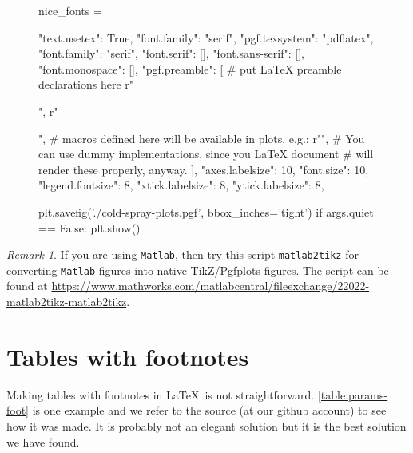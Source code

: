 \documentclass[authoryear,3p,times,preprint,review,fleqn]{elsarticle}
\numberwithin{equation}{section}
\theoremstyle{remark}
\newtheorem{rmk}{Remark}
\begin{document}
\begin{appendices}
\begin{figure}[!h]
  \begin{snippet}[caption={Python script for plotting data.},label={snippet_matplotlib_pgf},framerule=1pt,tabsize=3]   
    nice_fonts = {
            "text.usetex": True,
            "font.family": "serif",
            "pgf.texsystem": "pdflatex",
            "font.family": "serif",
            "font.serif": [],
            "font.sans-serif": [],
            "font.monospace": [],
            "pgf.preamble": [
            # put LaTeX preamble declarations here
            r"\usepackage[utf8x]{inputenc}",
            r"\usepackage[T1]{fontenc}",
            # macros defined here will be available in plots, e.g.:
            r"\newcommand{\vect}[1]{#1}",
            # You can use dummy implementations, since you LaTeX document
            # will render these properly, anyway.
            ],
            "axes.labelsize": 10,
            "font.size": 10,
            "legend.fontsize": 8,
            "xtick.labelsize": 8,
            "ytick.labelsize": 8,
    }
    plt.savefig('./cold-spray-plots.pgf', bbox_inches='tight') 
    if args.quiet == False:
        plt.show()
  \end{snippet}
\end{figure}

\begin{rmk}
If you are using \texttt{Matlab}, then try this script \texttt{matlab2tikz} for converting \texttt{Matlab} figures into native TikZ/Pgfplots figures. The script can be found at
\url{https://www.mathworks.com/matlabcentral/fileexchange/22022-matlab2tikz-matlab2tikz}.
\end{rmk}

\section{Tables with footnotes}\label{sec:tab-foonote}

Making tables with footnotes in \LaTeX\ is not straightforward.  \cref{table:params-foot} is one example and we refer to the source (at our github account) to see how it was made. It is probably not an elegant solution but it is the best solution we have found.


\end{appendices}
\end{document}
